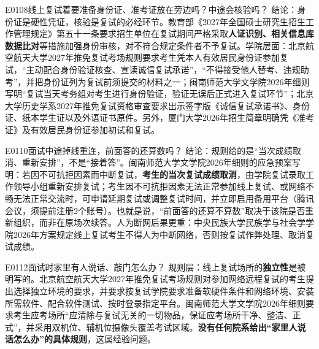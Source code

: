 \begin{qa}{E0108}{线上复试着要准备身份证、准考证放在旁边吗？中途会核验吗？}
结论：身份证是硬性凭证，核验是复试的必经环节。教育部《2027年全国硕士研究生招生工作管理规定》第五十一条要求招生单位在复试期间严格采取\textbf{人证识别、相关信息库数据比对}等措施加强身份审核，对不符合规定条件者不予复试。学院层面：北京航空航天大学2027年推免复试考场规则要求考生凭本人有效居民身份证参加复试，“主动配合身份验证核查、宣读诚信复试承诺”，“不得接受他人替考、违规助考”，并把身份证列为复试前须提交的材料之一；闽南师范大学文学院2026年细则写明“复试当天考务组对考生进行身份验证，验证无误后正式进入复试环节”；北京大学历史学系2027年推免复试资格审查要求出示签字版《诚信复试承诺书》、身份证、纸本学生证以及外语证书原件。另外，厦门大学2026年招生简章明确凭《准考证》及有效居民身份证参加初试和复试。
\end{qa}

\begin{qa}{E0110}{面试中途掉线重连，前面答的还算数吗？}
结论：规则给的是“当次成绩取消、重新安排”，不是“接着答”。闽南师范大学文学院2026年细则的应急预案写明：若因不可抗拒因素而中断复试，\textbf{考生的当次复试成绩取消}，由学院复试录取工作领导小组重新安排复试；考生因不可抗拒因素无法正常参加线上复试、或网络不畅无法正常交流时，可申请延期复试或调整复试时间，并立即启用备用平台（腾讯会议，须提前注册2个账号）。也就是说，“前面答的还算不算数”取决于该院是否重新组织，而非在原场次续答。人为断网后果更重：中央民族大学民族学与社会学学院2026年方案规定线上复试考生不得人为中断网络，否则按复试作弊处理、取消复试成绩。
\end{qa}

\begin{qa}{E0112}{面试时家里有人说话、敲门怎么办？}
规则层：线上复试场所的\textbf{独立性}是被明写的。北京航空航天大学2027年推免复试考场规则对参加网络远程复试的考生提出选择独立环境的要求，并要求按复试学院要求准备软硬件条件和网络环境、安装所需软件、配合软件测试、按时登录指定平台。闽南师范大学文学院2026年细则要求考生应考场所“应清除与复试无关的一切物品，保证应考场所干净、整洁、正式”，并采用双机位、辅机位摄像头覆盖考试区域。\textbf{没有任何院系给出“家里人说话怎么办”的具体规则}，这属经验问题。
\end{qa}

